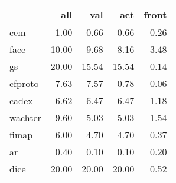 \begin{tabular}{lrrrr}
\hline
{}                  &    all &    val &    act &  front \\ \hline
\hline
cem                 &   1.00 &   0.66 &   0.66 &   0.26 \\ \hline
face                &  10.00 &   9.68 &   8.16 &   3.48 \\ \hline
gs                  &  20.00 &  15.54 &  15.54 &   0.14 \\ \hline
cfproto             &   7.63 &   7.57 &   0.78 &   0.06 \\ \hline
cadex               &   6.62 &   6.47 &   6.47 &   1.18 \\ \hline
wachter             &   9.60 &   5.03 &   5.03 &   1.54 \\ \hline
fimap               &   6.00 &   4.70 &   4.70 &   0.37 \\ \hline
ar                  &   0.40 &   0.10 &   0.10 &   0.20 \\ \hline
dice                &  20.00 &  20.00 &  20.00 &   0.52 \\ \hline
\hline
\end{tabular}
